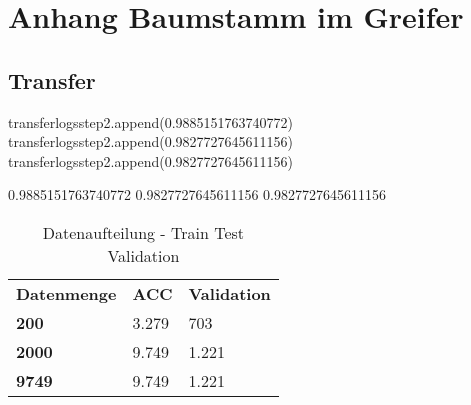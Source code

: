 \chapter{Anhang  Baumstamm im Greifer}
\label{appendix:BaumstammImGreifer}


	\section{Transfer}
	\label{appendix:Transfer}


transferlogsstep2.append(0.9885151763740772)
transferlogsstep2.append(0.9827727645611156)
transferlogsstep2.append(0.9827727645611156)

0.9885151763740772
0.9827727645611156
0.9827727645611156

	\begin{table}[ht]
	\centering
	\begin{tabularx}{\textwidth}{lll}
		 \textbf{Datenmenge} & \textbf{ACC}  & \textbf{Validation} 	 \\
		\textbf{200} 				 & 	3.279			& 703		\\
		\textbf{2000}	 	  &  9.749	   & 1.221 	\\		
		\textbf{9749}	 	  &  9.749	   & 1.221 	\\	
	\end{tabularx}
	\caption{Datenaufteilung - Train Test Validation}
	\label{table:DatenaufteilungTrainTestValidation}
\end{table}